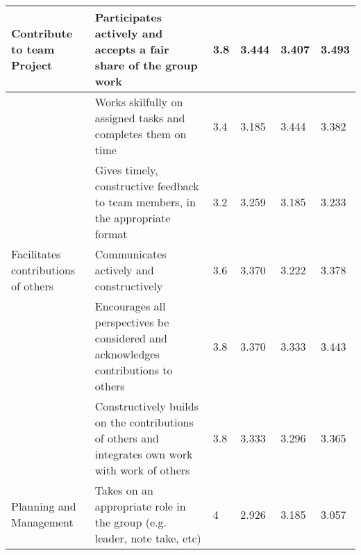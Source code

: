 \documentclass[sigconf, anonymous=true]{acmart}
\begin{document}
\begin{table*}[ht]
\begin{tabular} {| p{3cm} | p{8cm} | p{1cm}| p{1cm} | p{1cm}| p{1cm} |}
		Contribute to team Project          & Participates actively and accepts a fair share of the group work                                 & 3.8                                                     & 3.444                                                 & 3.407                                                 & 3.493                                               \\
		\hline
		& Works skilfully on assigned tasks and completes them on time                                     & 3.4                                                     & 3.185                                                 & 3.444                                                 & 3.382                                               \\
		\hline
		& Gives timely, constructive feedback to team members, in the appropriate format                   & 3.2                                                     & 3.259                                                 & 3.185                                                 & 3.233                                               \\
		\hline
		Facilitates contributions of others & Communicates actively and constructively                                                         & 3.6                                                     & 3.370                                                 & 3.222                                                 & 3.378                                               \\
		\hline
		& Encourages all perspectives be considered and acknowledges contributions to others               & 3.8                                                     & 3.370                                                 & 3.333                                                 & 3.443                                               \\
		\hline
		& Constructively builds on the contributions of others and integrates own work with work of others & 3.8                                                     & 3.333                                                 & 3.296                                                 & 3.365                                               \\
		\hline
		Planning and Management             & Takes on an appropriate role in the group (e.g. leader, note take, etc)                          & 4                                                       & 2.926                                                 & 3.185                                                 & 3.057                                               \\

\end{tabular}
\end{table*}
\end{document}
